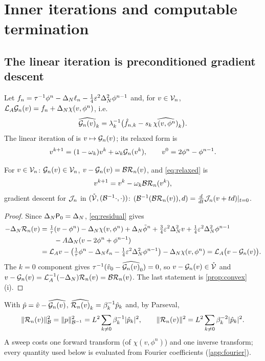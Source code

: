 \section{Inner iterations and computable termination}\label{sec:solver}

\subsection{The linear iteration is preconditioned gradient descent}
Let $f_n=\tau^{-1}\phi^n-\Delta_N\ell_n-\frac14\varepsilon^2\Delta_N^2\phi^{n-1}$ and, for $v\in\mathcal{V}_n$, $\mathcal{L}_A\mathcal{G}_n(v)=f_n+\Delta_N\chi(v,\phi^n)$, i.e.
\begin{equation}\label{eq:Gfourier}
\widehat{\mathcal{G}_n(v)}_k=\lambda_k^{-1}\big(\hat f_{n,k}-s_k\,\widehat{\chi(v,\phi^n)}_k\big).
\end{equation}
The linear iteration of \cite{ChengWangWiseYue2016} is $v\mapsto\mathcal{G}_n(v)$; its relaxed form is
\begin{equation}\label{eq:relaxed}
v^{k+1}=(1-\omega_k)v^k+\omega_k\mathcal{G}_n(v^k),\qquad v^0=2\phi^n-\phi^{n-1}.
\end{equation}

\begin{lemma}\label{lem:gradient}
For $v\in\mathcal{V}_n$: $\mathcal{G}_n(v)\in\mathcal{V}_n$, $v-\mathcal{G}_n(v)=\mathcal{B}\mathcal{R}_n(v)$, and \eqref{eq:relaxed} is
\begin{equation}\label{eq:descent}
v^{k+1}=v^k-\omega_k\mathcal{B}\mathcal{R}_n(v^k),
\end{equation}
gradient descent for $\mathcal{J}_n$ in $(\mathring{\mathcal{V}},(\mathcal{B}^{-1}\cdot,\cdot))$: $(\mathcal{B}^{-1}(\mathcal{B}\mathcal{R}_n(v)),d)=\frac{d}{dt}\mathcal{J}_n(v+td)|_{t=0}$.
\end{lemma}

\begin{proof}
Since $\Delta_N\mathsf{P}_0=\Delta_N$, \eqref{eq:residual} gives
\begin{align*}
-\Delta_N\mathcal{R}_n(v)&=\tfrac1\tau(v-\phi^n)-\Delta_N\chi(v,\phi^n)+\Delta_N\tilde\phi^n+\tfrac34\varepsilon^2\Delta_N^2v+\tfrac14\varepsilon^2\Delta_N^2\phi^{n-1}\\
&\qquad-A\Delta_N(v-2\phi^n+\phi^{n-1})\\
&=\mathcal{L}_A v-\big(\tfrac1\tau\phi^n-\Delta_N\ell_n-\tfrac14\varepsilon^2\Delta_N^2\phi^{n-1}\big)-\Delta_N\chi(v,\phi^n)=\mathcal{L}_A\big(v-\mathcal{G}_n(v)\big).
\end{align*}
The $k=0$ component gives $\tau^{-1}(\hat v_0-\widehat{\mathcal{G}_n(v)}_0)=0$, so $v-\mathcal{G}_n(v)\in\mathring{\mathcal{V}}$ and $v-\mathcal{G}_n(v)=\mathcal{L}_A^{-1}(-\Delta_N)\mathcal{R}_n(v)=\mathcal{B}\mathcal{R}_n(v)$. The last statement is \cref{prop:convex}(i).
\end{proof}

With $\hat p=\hat v-\widehat{\mathcal{G}_n(v)}$, $\widehat{\mathcal{R}_n(v)}_k=\beta_k^{-1}\hat p_k$ and, by Parseval,
\begin{equation}\label{eq:Rnorms}
\lVert \mathcal{R}_n(v)\rVert_{\mathcal{B}}^2=\lVert p\rVert_{\mathcal{B}^{-1}}^2=L^2\sum_{k\ne0}\beta_k^{-1}|\hat p_k|^2,\qquad \lVert \mathcal{R}_n(v)\rVert^2=L^2\sum_{k\ne0}\beta_k^{-2}|\hat p_k|^2 .
\end{equation}
A sweep costs one forward transform (of $\chi(v,\phi^n)$) and one inverse transform; every quantity used below is evaluated from Fourier coefficients (\cref{app:fourier}).

